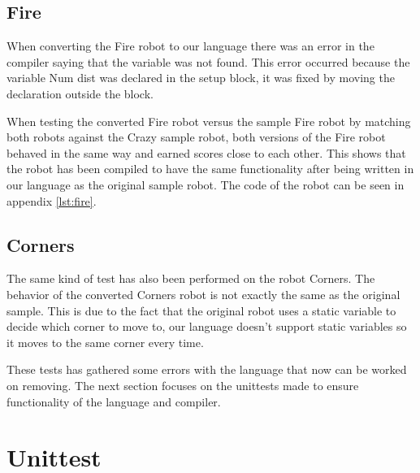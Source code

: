 \subsection{Fire}
When converting the Fire robot to our language there was an error in the compiler saying that the variable was not found. This error occurred because the variable Num dist was declared in the setup block, it was fixed by moving the declaration outside the block.

When testing the converted Fire robot versus the sample Fire robot by matching both robots against the Crazy sample robot, both versions of the Fire robot behaved in the same way and earned scores close to each other.
This shows that the robot has been compiled to have the same functionality after being written in our language as the original sample robot.
The code of the robot can be seen in appendix \ref{lst:fire}.

\subsection{Corners}
The same kind of test has also been performed on the robot Corners. The behavior of the converted Corners robot is not exactly the same as the original sample. This is due to the fact that the original robot uses a static variable to decide which corner to move to, our language doesn't support static variables so it moves to the same corner every time. 

These tests has gathered some errors with the language that now can be worked on removing. The next section focuses on the unittests made to ensure functionality of the language and compiler.

\section{Unittest}
